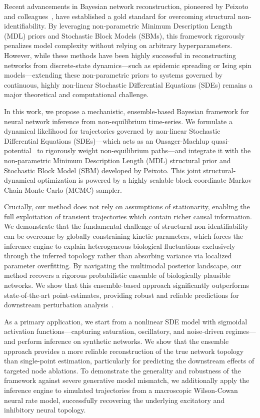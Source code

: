 \documentclass[10pt, aps, rmp,  twocolumn, superscriptaddress, floatfix, showkeys]{revtex4-2}
\begin{document}
Recent advancements in Bayesian network reconstruction, pioneered by Peixoto and colleagues~\cite{peixoto2019network, peixoto2025network}, have established a gold standard for overcoming structural non-identifiability. By leveraging non-parametric Minimum Description Length (MDL) priors and Stochastic Block Models (SBMs), this framework rigorously penalizes model complexity without relying on arbitrary hyperparameters. However, while these methods have been highly successful in reconstructing networks from discrete-state dynamics—such as epidemic spreading or Ising spin models—extending these non-parametric priors to systems governed by continuous, highly non-linear Stochastic Differential Equations (SDEs) remains a major theoretical and computational challenge.

In this work, we propose a mechanistic, ensemble-based Bayesian framework for neural network inference from non-equilibrium time-series. We formulate a dynamical likelihood for trajectories governed by non-linear Stochastic Differential Equations (SDEs)—which acts as an Onsager-Machlup quasi-potential~\cite{onsager1953fluctuations} to rigorously weight non-equilibrium paths—and integrate it with the non-parametric Minimum Description Length (MDL) structural prior and Stochastic Block Model (SBM) developed by Peixoto. This joint structural-dynamical optimization is powered by a highly scalable block-coordinate Markov Chain Monte Carlo (MCMC) sampler.

Crucially, our method does not rely on assumptions of stationarity, enabling the full exploitation of transient trajectories which contain richer causal information. We demonstrate that the fundamental challenge of structural non-identifiability can be overcome by globally constraining kinetic parameters, which forces the inference engine to explain heterogeneous biological fluctuations exclusively through the inferred topology rather than absorbing variance via localized parameter overfitting. By navigating the multimodal posterior landscape, our method recovers a rigorous probabilistic ensemble of biologically plausible networks. We show that this ensemble-based approach significantly outperforms state-of-the-art point-estimates, providing robust and reliable predictions for downstream perturbation analysis~\cite{peel2022statistical}.

As a primary application, we start from a nonlinear SDE model with sigmoidal activation functions—capturing saturation, oscillatory, and noise-driven regimes—and perform inference on synthetic networks. We show that the ensemble approach provides a more reliable reconstruction of the true network topology than single-point estimation, particularly for predicting the downstream effects of targeted node ablations. To demonstrate the generality and robustness of the framework against severe generative model mismatch, we additionally apply the inference engine to simulated trajectories from a macroscopic Wilson-Cowan neural rate model, successfully recovering the underlying excitatory and inhibitory neural topology.
\end{document}
